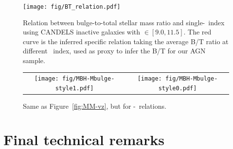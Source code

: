\documentclass[apj]{emulateapj}
\begin{document}
\begin{figure}
\centering
{
\texttt{[image: fig/BT\_relation.pdf]}
}
\caption{\label{fig:BT-n_relation} 
Relation between bulge-to-total stellar mass ratio and single-\sersic\ index using CANDELS inactive galaxies with \smass$\in [9.0, 11.5]$. The red curve is the inferred specific relation taking the average B/T ratio at different \sersic\ index, used as proxy to infer the B/T for our AGN sample.
}
\end{figure} 

\begin{figure}
\centering
\begin{tabular}{c c}
{\texttt{[image: fig/MBH-Mbulge-style1.pdf]}}&
{\texttt{[image: fig/MBH-Mbulge-style0.pdf]}}\\
\end{tabular}
\caption{\label{fig:MM_bulge-vz}
Same as Figure~\ref{fig:MM-vz}, but for \mbh-\bmass\ relations.}
\end{figure} 


\section{Final technical remarks}
\label{sec:dis}


%
\end{document}
